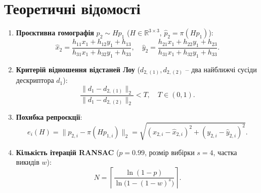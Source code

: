 \documentclass[14pt, a4paper]{extarticle}
\begin{document}
\section{Теоретичні відомості}
\begin{enumerate}
    \item \textbf{Проєктивна гомографія} $p_2 \sim H p_1$ ($H \in \mathbb{R}^{3 \times 3}$, $\hat{p}_2 = \pi(H p_1)$):
    \begin{equation}\label{eq:homography_cart}
        \hat{x}_2 = \frac{h_{11} x_1 + h_{12} y_1 + h_{13}}{h_{31} x_1 + h_{32} y_1 + h_{33}}, \quad
        \hat{y}_2 = \frac{h_{21} x_1 + h_{22} y_1 + h_{23}}{h_{31} x_1 + h_{32} y_1 + h_{33}}.
    \end{equation}

    \item \textbf{Критерій відношення відстаней Лоу} ($d_{2,(1)}, d_{2,(2)}$ -- два найближчі сусіди дескриптора $d_1$):
    \begin{equation}\label{eq:lowe_ratio}
        \frac{\|d_1 - d_{2, (1)}\|_2}{\|d_1 - d_{2, (2)}\|_2} < T, \quad T \in (0, 1).
    \end{equation}

    \item \textbf{Похибка репроєкції}:
    \begin{equation}\label{eq:reproj_err}
        e_i(H) = \|p_{2, i} - \pi(H p_{1, i})\|_2 = \sqrt{(x_{2, i} - \hat{x}_{2, i})^2 + (y_{2, i} - \hat{y}_{2, i})^2}.
    \end{equation}

    \item \textbf{Кількість ітерацій RANSAC} ($p = 0.99$, розмір вибірки $s = 4$, частка викидів $w$):
    \begin{equation}\label{eq:ransac_iters}
        N = \left\lceil \frac{\ln(1 - p)}{\ln\bigl(1 - (1 - w)^s\bigr)} \right\rceil.
    \end{equation}


\end{enumerate}
\end{document}
